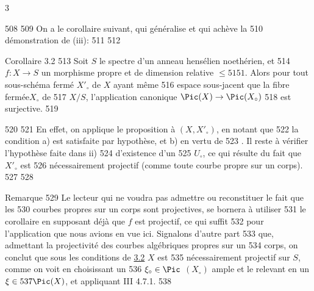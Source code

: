 3	\documentclass[10pt]{../fichiers-configuration-latex/smfart}
\begin{document}
   508	
   509	On a le corollaire suivant, qui généralise  et qui achève la
   510	démonstration de  (iii):
   511	
   512	\begin{enonce*}{Corollaire 3.2}
   513	Soit $S$ le spectre d'un anneau hensélien noethérien, et
   514	$f:X\rightarrow S$ un morphisme propre et de dimension relative $	1$. Alors pour tout sous-schéma fermé $X'_{\circ}$ de $X$ ayant même
   516	espace sous-jacent que la fibre fermée\pageoriginale $X_{\circ}$ de
   517	$X/S$, l'application canonique $\Pic(X)\rightarrow \Pic(X_{\circ})$
   518	est surjective.
   519	\end{enonce*}
   520	
   521	En effet, on applique le proposition à $(X,X'_{\circ})$, en notant que
   522	la condition a) est satisfaite par hypothèse, et b) en vertu de 
   523	. Il reste à vérifier l'hypothèse faite dans ii)
   524	d'existence d'un 
   525	$U_{\circ}$, ce qui résulte du fait que $X'_{\circ}$ est
   526	nécessairement projectif (comme toute courbe propre sur un corps).
   527	
   528	\begin{enonce*}[remark]{Remarque}
   529	Le lecteur qui ne voudra pas admettre ou reconstituer le fait que les
   530	courbes propres sur un corps sont projectives, se bornera à utiliser
   531	le corollaire en supposant déjà que $f$ est projectif, ce qui suffit
   532	pour l'application que nous avions en vue ici. Signalons d'autre part
   533	que, admettant la projectivité des courbes algébriques propres sur un
   534	corps, on conclut que sous les conditions de \hyperref[XIII.cor3.2]{3.2} $X$ est
   535	nécessairement projectif sur $S$, comme on voit en choisissant un
   536	$\xi_{\circ}\in \Pic$ $(X_{\circ})$ ample et le relevant en un $\xi{}	\Pic(X)$, et appliquant \EGA III 4.7.1.
   538	\end{enonce*}
\end{document}
